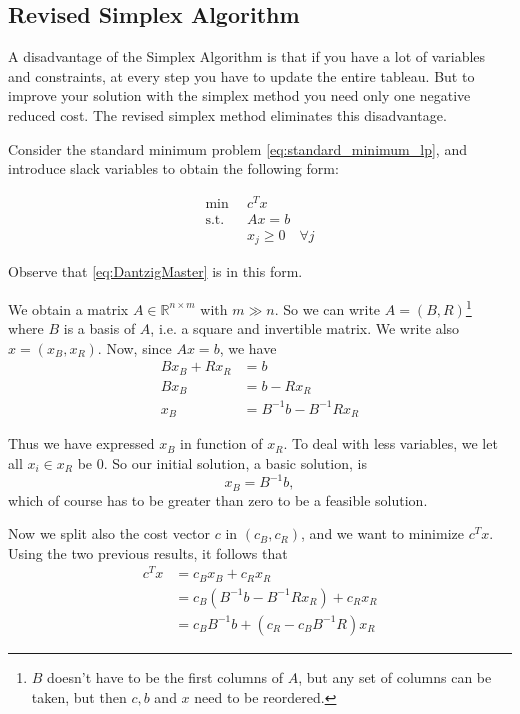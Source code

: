 \documentclass[a4paper,12pt]{article}
\begin{document}
\subsection{Revised Simplex Algorithm}
\label{chapter:RevisedSimplex}

A disadvantage of the Simplex Algorithm is that if you have a lot of variables and constraints, at every step you have to update the entire tableau. But to improve your solution with the simplex method you need only one negative reduced cost. The revised simplex method eliminates this disadvantage. 

Consider the standard minimum problem \eqref{eq:standard_minimum_lp}, and introduce slack variables to obtain the following form:

\begin{equation}
\begin{aligned}  
\min \enspace& c^Tx \\
\text{s.t.} \enspace& Ax = b \\
&x_j \geq 0 \quad \forall j 
\label{eq:standRevised}
\end{aligned} 
\end{equation}

Observe that \eqref{eq:DantzigMaster} is in this form.

We obtain a matrix $A \in \mathbb{R}^{n \times m}$ with $m \gg n$. So we can write $A = (B,R)$\footnote{$B$ doesn't have to be the first columns of $A$, but any set of columns can be taken, but then $c,b$ and $x$ need to be reordered.} where $B$ is a basis of $A$, i.e. a square and invertible matrix. We write also $x = (x_B,x_R)$. Now, since $Ax = b$, we have
\begin{align*}
Bx_B +Rx_R &= b \\
Bx_B &= b - Rx_R \\
x_B &= B^{-1}b - B^{-1}Rx_R
\end{align*}   

Thus we have expressed $x_B$ in function of $x_R$. To deal with less variables, we let all $x_i \in x_R$ be $0$. So our initial solution, a basic solution, is
\[
x_B = B^{-1}b,
\]
which of course has to be greater than zero to be a feasible solution.

Now we split also the cost vector $c$ in $(c_B,c_R)$, and we want to minimize $c^Tx$. Using the two previous results, it follows that
\begin{align*}
c^Tx &= c_Bx_B + c_Rx_R \\
&= c_B( B^{-1}b - B^{-1}Rx_R) + c_Rx_R \\
&= c_BB^{-1}b + (c_R-c_BB^{-1}R)x_R 
\end{align*}
\end{document}
